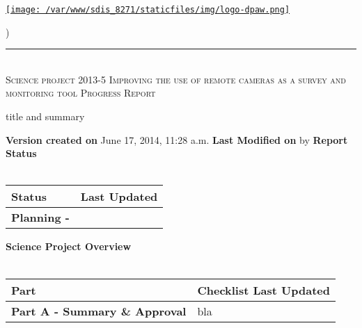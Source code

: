 \documentclass[version=last, paper=a4, DIV=18, usenames, dvipsnames]{scrartcl}
\newcommand{\HRule}{\rule{\linewidth}{0.1pt}}
\begin{document}
\setcounter{secnumdepth}{-1}


\begin{titlepage}
\begin{center}
\begin{minipage}[t]{0.28\textwidth}
\begin{flushleft}
\href{http://www.dpaw.wa.gov.au}{\texttt{[image: /var/www/sdis\_8271/staticfiles/img/logo-dpaw.png]}}
\end{flushleft}
\end{minipage}
\begin{minipage}[b]{0.7\textwidth}
\begin{flushright}
    \href{http://sdis.dpaw.wa.gov.au/documents/progressreport/1142/download/}{}) \\
\end{flushright}
\end{minipage}
\HRule \\[0.4cm]
\vfill
\textsc{\Huge Science project 2013-5 Improving the use of remote cameras as a survey and monitoring tool \newline }
\vfill
\textsc{\Huge Progress Report}

\vfill\vfill\vfill\vfill
title and summary

\vfill\vfill\vfill\vfill\vfill\vfill\vfill\vfill

\textbf{Version created on} June 17, 2014, 11:28 a.m.
\vfill
\textbf{Last Modified on}  by 
\vfill\vfill
\textbf{Report Status}\\\,
\begin{tabu} to \linewidth { | X[l] | X | }
\hline
{}
Status & Last Updated \\
\hline
\textbf{Planning - } \\
\hline
\end{tabu}
\vfill
\textbf{Science Project Overview}\\\,
\begin{tabu} to \linewidth { | X[l] | X | }
\hline
{}
Part & Checklist Last Updated \\
\hline
\textbf{Part A - Summary \& Approval} & bla \\
\hline
\end{tabu}

\end{center}
\end{titlepage}

\setcounter{tocdepth}{2}
\tableofcontents
\clearpage
\end{document}
